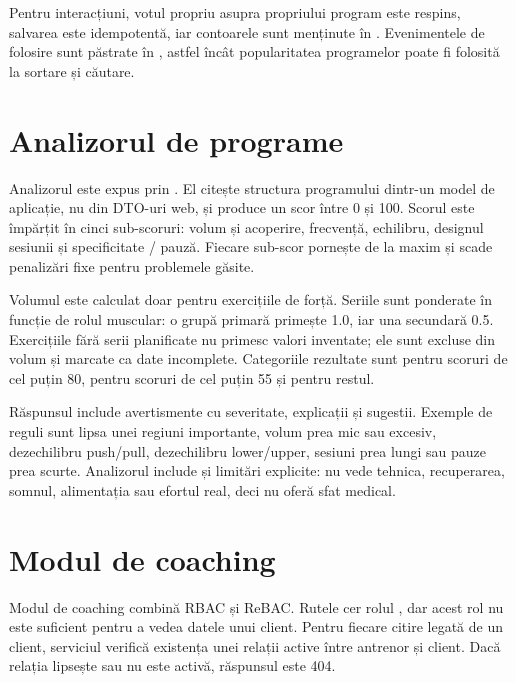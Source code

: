 Pentru interacțiuni, votul propriu asupra propriului program este respins, salvarea este idempotentă,
iar contoarele sunt menținute în . Evenimentele de folosire sunt păstrate în
, astfel încât popularitatea programelor poate fi folosită la sortare și
căutare.

\section{Analizorul de programe}
\label{sec:analizor}

Analizorul este expus prin . El citește structura programului
dintr-un model de aplicație, nu din DTO-uri web, și produce un scor între 0 și 100. Scorul este împărțit
în cinci sub-scoruri: volum și acoperire, frecvență, echilibru, designul sesiunii și specificitate /
pauză. Fiecare sub-scor pornește de la maxim și scade penalizări fixe pentru problemele găsite.

Volumul este calculat doar pentru exercițiile de forță. Seriile sunt ponderate în funcție de rolul
muscular: o grupă primară primește 1.0, iar una secundară 0.5. Exercițiile fără serii planificate nu
primesc valori inventate; ele sunt excluse din volum și marcate ca date incomplete. Categoriile
rezultate sunt  pentru scoruri de cel puțin 80,  pentru
scoruri de cel puțin 55 și  pentru restul.

Răspunsul include avertismente cu severitate, explicații și sugestii. Exemple de reguli sunt lipsa unei
regiuni importante, volum prea mic sau excesiv, dezechilibru push/pull, dezechilibru lower/upper,
sesiuni prea lungi sau pauze prea scurte. Analizorul include și limitări explicite: nu vede tehnica,
recuperarea, somnul, alimentația sau efortul real, deci nu oferă sfat medical.

\section{Modul de coaching}
\label{sec:coaching}

Modul de coaching combină RBAC și ReBAC. Rutele  cer rolul , dar acest
rol nu este suficient pentru a vedea datele unui client. Pentru fiecare citire legată de un client,
serviciul verifică existența unei relații active între antrenor și client. Dacă relația lipsește sau nu
este activă, răspunsul este 404.

